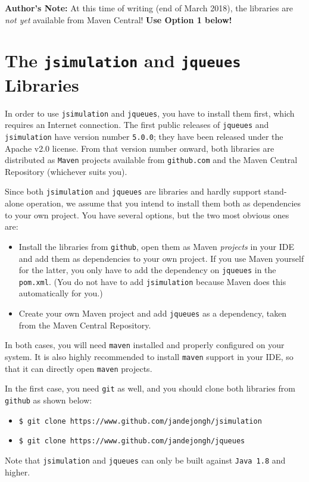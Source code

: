{\bf Author's Note:} At this time of writing (end of March 2018),
the libraries are {\em not yet\/} available from Maven Central!
{\bf Use Option 1 below!}

\section{The \texttt{jsimulation} and \texttt{jqueues} Libraries}

In order to use \lstinline|jsimulation|
  and \lstinline|jqueues|, you have to install
  them first,
  which requires an Internet connection.
The first public releases of \lstinline|jqueues| and
  \lstinline|jsimulation| have version number \lstinline|5.0.0|;
  they have been released under the Apache v2.0 license.
From that version number onward,
  both libraries are distributed as \lstinline|Maven|
  projects
  available from \lstinline|github.com|
  and the Maven Central Repository
  (whichever suits you).
  
Since both \lstinline|jsimulation|
  and \lstinline|jqueues| are libraries
  and hardly support stand-alone operation,
  we assume that you intend to install
  them both as dependencies to your own project.
You have several options, but the two most obvious ones are:
\begin{itemize}
	\item Install the libraries from \lstinline|github|,
	        open them as Maven {\em projects\/} in your IDE
	        and add them as dependencies to your own project.
	      If you use Maven yourself for the latter,
	        you only have to add
	        the dependency on \lstinline|jqueues| in the
	        \lstinline|pom.xml|.
	      (You do not have to add \lstinline|jsimulation|
            because Maven does this automatically for you.)
	\item Create your own Maven project and add
	        \lstinline|jqueues| as a dependency,
	        taken from the Maven Central Repository.
\end{itemize}
In both cases,
  you will need \lstinline|maven| installed and properly configured on your system.
It is also highly recommended to install
  \lstinline|maven| support in your IDE,
  so that it can directly open \lstinline|maven| projects.

In the first case, you need \lstinline|git| as well,
  and you should clone both libraries
  from \lstinline|github| as shown below:
\begin{itemize}
	\item \lstinline|$ git clone https://www.github.com/jandejongh/jsimulation|
	\item \lstinline|$ git clone https://www.github.com/jandejongh/jqueues|
\end{itemize}
Note that \lstinline|jsimulation| and \lstinline|jqueues|
  can only be built against \lstinline|Java 1.8| and higher.

